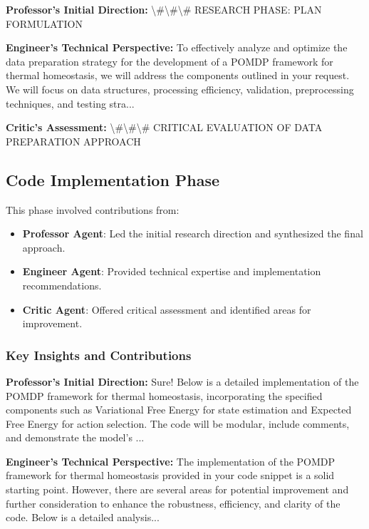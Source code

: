 \documentclass[11pt,a4paper]{article}
\begin{document}
\textbf{Professor's Initial Direction:} \textbackslash{}#\textbackslash{}#\textbackslash{}# RESEARCH PHASE: PLAN FORMULATION


\textbf{Engineer's Technical Perspective:} To effectively analyze and optimize the data preparation strategy for the development of a POMDP framework for thermal homeostasis, we will address the components outlined in your request. We will focus on data structures, processing efficiency, validation, preprocessing techniques, and testing stra...


\textbf{Critic's Assessment:} \textbackslash{}#\textbackslash{}#\textbackslash{}# CRITICAL EVALUATION OF DATA PREPARATION APPROACH


\subsection{Code Implementation Phase}


This phase involved contributions from:

\begin{itemize}
\item \textbf{Professor Agent}: Led the initial research direction and synthesized the final approach.
\item \textbf{Engineer Agent}: Provided technical expertise and implementation recommendations.
\item \textbf{Critic Agent}: Offered critical assessment and identified areas for improvement.
\end{itemize}

\subsubsection{Key Insights and Contributions}


\textbf{Professor's Initial Direction:} Sure! Below is a detailed implementation of the POMDP framework for thermal homeostasis, incorporating the specified components such as Variational Free Energy for state estimation and Expected Free Energy for action selection. The code will be modular, include comments, and demonstrate the model's ...


\textbf{Engineer's Technical Perspective:} The implementation of the POMDP framework for thermal homeostasis provided in your code snippet is a solid starting point. However, there are several areas for potential improvement and further consideration to enhance the robustness, efficiency, and clarity of the code. Below is a detailed analysis...
\end{document}
